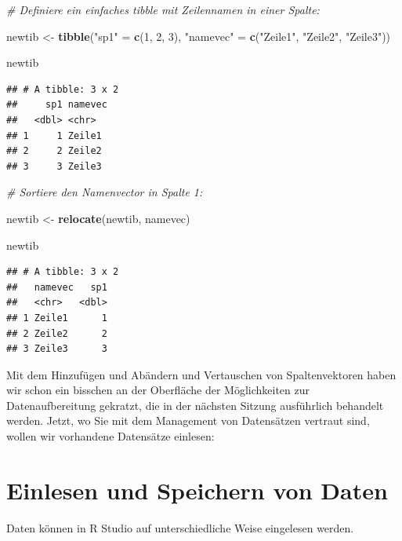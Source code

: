 \documentclass[
  ngerman,
]{book}
\newenvironment{Shaded}{\begin{snugshade}}{\end{snugshade}}
\newcommand{\CommentTok}[1]{\textcolor[rgb]{0.56,0.35,0.01}{\textit{#1}}}
\newcommand{\DecValTok}[1]{\textcolor[rgb]{0.00,0.00,0.81}{#1}}
\newcommand{\FunctionTok}[1]{\textcolor[rgb]{0.13,0.29,0.53}{\textbf{#1}}}
\newcommand{\NormalTok}[1]{#1}
\newcommand{\OtherTok}[1]{\textcolor[rgb]{0.56,0.35,0.01}{#1}}
\newcommand{\StringTok}[1]{\textcolor[rgb]{0.31,0.60,0.02}{#1}}
\begin{document}
\begin{Shaded}
\begin{Highlighting}[]
\CommentTok{\# Definiere ein einfaches tibble mit Zeilennamen in einer Spalte:}

\NormalTok{newtib }\OtherTok{\textless{}{-}} \FunctionTok{tibble}\NormalTok{(}\StringTok{"sp1"} \OtherTok{=} \FunctionTok{c}\NormalTok{(}\DecValTok{1}\NormalTok{, }\DecValTok{2}\NormalTok{, }\DecValTok{3}\NormalTok{), }\StringTok{"namevec"} \OtherTok{=} \FunctionTok{c}\NormalTok{(}\StringTok{"Zeile1"}\NormalTok{, }\StringTok{"Zeile2"}\NormalTok{, }\StringTok{"Zeile3"}\NormalTok{))}

\NormalTok{newtib}
\end{Highlighting}
\end{Shaded}

\begin{verbatim}
## # A tibble: 3 x 2
##     sp1 namevec
##   <dbl> <chr>  
## 1     1 Zeile1 
## 2     2 Zeile2 
## 3     3 Zeile3
\end{verbatim}

\begin{Shaded}
\begin{Highlighting}[]
\CommentTok{\# Sortiere den Namenvector in Spalte 1:}

\NormalTok{newtib }\OtherTok{\textless{}{-}} \FunctionTok{relocate}\NormalTok{(newtib, namevec)}

\NormalTok{newtib}
\end{Highlighting}
\end{Shaded}

\begin{verbatim}
## # A tibble: 3 x 2
##   namevec   sp1
##   <chr>   <dbl>
## 1 Zeile1      1
## 2 Zeile2      2
## 3 Zeile3      3
\end{verbatim}

Mit dem Hinzufügen und Abändern und Vertauschen von Spaltenvektoren haben wir schon ein bisschen an der Oberfläche der Möglichkeiten zur Datenaufbereitung gekratzt, die in der nächsten Sitzung ausführlich behandelt werden. Jetzt, wo Sie mit dem Management von Datensätzen vertraut sind, wollen wir vorhandene Datensätze einlesen:

\section{Einlesen und Speichern von Daten}\label{einlesen-und-speichern-von-daten}

Daten können in R Studio auf unterschiedliche Weise eingelesen werden.
\end{document}
